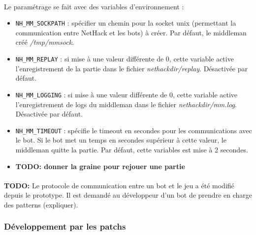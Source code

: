 \documentclass[a4paper,12pt]{article}
\begin{document}
\paragraph{}Le paramétrage se fait avec des variables d'environnement :
\begin{itemize}
\item \verb!NH_MM_SOCKPATH! : spécifier un chemin pour la socket unix (permettant la communication entre NetHack et les bots) à créer. Par défaut, le middleman créé \emph{/tmp/mmsock}.
\item \verb!NH_MM_REPLAY! : si mise à une valeur différente de 0, cette variable active l'enregistrement de la partie dans le fichier \emph{nethackdir/replay}. Désactivée par défaut.
\item \verb!NH_MM_LOGGING! : si mise à une valeur différente de 0, cette variable active l'enregistrement de logs du middleman dans le fichier \emph{nethackdir/mm.log}. Désactivée par défaut.
\item \verb!NH_MM_TIMEOUT! : spécifie le timeout en secondes pour les communications avec le bot. Si le bot met un temps en secondes supérieur à cette valeur, le middleman quitte la partie. Par défaut, cette variables est mise à 2 secondes.
\item \textbf{TODO: donner la graine pour rejouer une partie}
\end{itemize}

\paragraph{} \textbf{TODO:} Le protocole de communication entre un bot et le jeu a été modifié depuis le prototype. Il est demandé au développeur d'un bot de prendre en charge des patterns (expliquer).


\subsubsection*{Développement par les patchs}
\end{document}
